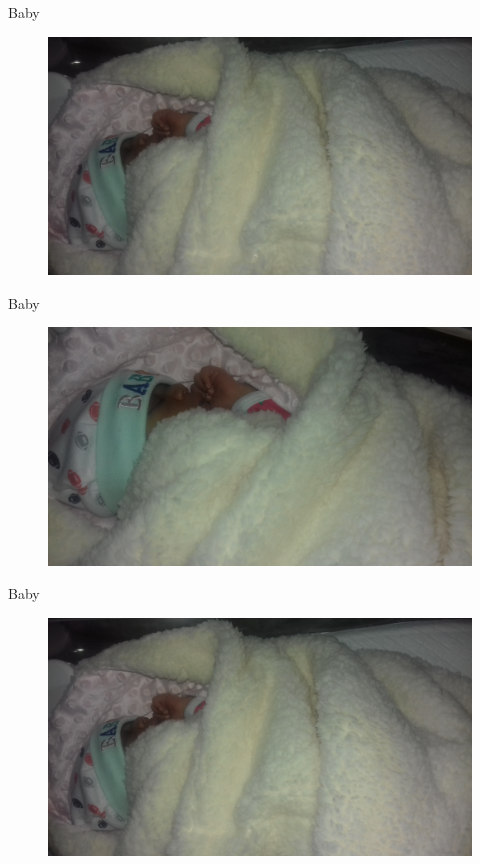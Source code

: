 \documentclass[11pt,pdf]{beamer}
\begin{document}
\begin{frame}{Baby}
\begin{figure}[t]
	\centering
	\includegraphics[width=1.03\linewidth]{Images/baby1.jpg}
\end{figure}
\end{frame}


\begin{frame}{Baby}
\begin{figure}[t]
	\centering
	\includegraphics[width=1.03\linewidth]{Images/baby2.jpg}
\end{figure}
\end{frame}

\begin{frame}{Baby}
\begin{figure}[t]
	\centering
	\includegraphics[width=1.03\linewidth]{Images/baby3.jpg}
\end{figure}
\end{frame}
\end{document}
